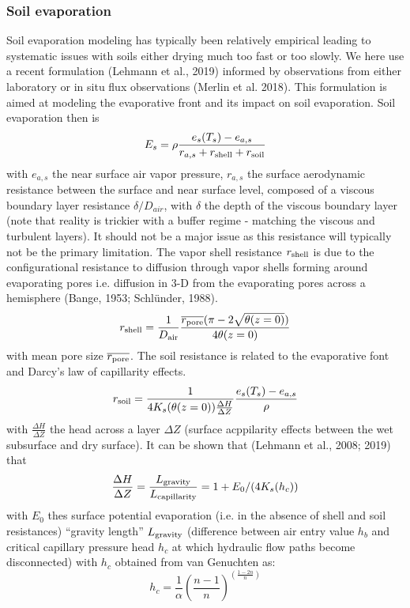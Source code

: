 \documentclass{article}
\begin{document}
\subsubsection{Soil evaporation}
Soil evaporation modeling has typically been relatively empirical leading to systematic issues with soils either drying much too fast or too slowly. We here use a recent formulation (Lehmann et al., 2019) informed by observations from either laboratory or in situ flux observations (Merlin et al. 2018). This formulation is aimed at modeling the evaporative front and its impact on soil evaporation. 
Soil evaporation then is 
\begin{equation}
    E_s = \rho \frac{e_s(T_s)-e_{a,s}}{r_{a,s}+r_{\rm shell}+r_{\rm soil}}
\end{equation}
with $e_{a,s}$ the near surface air vapor pressure, $r_{a,s}$ the surface aerodynamic resistance between the surface and near surface level, composed of a viscous boundary layer resistance $\delta /D_{air}$, with $\delta$ the depth of the viscous boundary layer (note that reality is trickier with a buffer regime - matching the viscous and turbulent layers). It should not be a major issue as this resistance will typically not be the primary limitation. The vapor shell resistance $r_{\rm shell}$ is due to the configurational resistance to diffusion through vapor shells forming around evaporating pores i.e. diffusion in 3-D from the evaporating pores across a hemisphere (Bange, 1953; Schlünder, 1988).
\begin{equation}
    r_{\rm shell} = \frac{1}{D_{\rm air}}\frac{\overline{r_{\rm pore}}(\pi-2\sqrt{\theta(z=0)})}{4\theta(z=0)}
\end{equation}
with mean pore size $\overline{r_{\rm pore}}$.
The soil resistance is related to the evaporative font and Darcy's law of capillarity effects.
\begin{equation}
    r_{\rm soil} = \frac{1}{4 K_s(\theta(z=0))\frac{\Delta H}{\Delta Z}}\frac{e_s(T_s)-e_{a,s}}{\rho}
\end{equation}
with $\frac{\Delta H}{\Delta Z}$ the head across a layer $\Delta Z$ (surface acppilarity effects between the wet subsurface and dry surface). It can be shown that (Lehmann et al., 2008; 2019) that 
\begin{equation}
   \frac{\Delta H}{\Delta Z} = \frac{L_{\rm gravity}}{L_{\rm capillarity}} = 1+E_0/(4K_s(h_c))
\end{equation}
with $E_0$ thes surface potential evaporation (i.e. in the absence of shell and soil resistances) “gravity length” $L_{\rm gravity}$ (difference between air entry value $h_b$ and critical capillary pressure head $h_c$ at which hydraulic flow paths become disconnected) with $h_c$ obtained from van Genuchten as:
\begin{equation}
   h_c = \frac{1}{\alpha}\left( \frac{n-1}{n} \right)^{\left( \frac{1-2n}{n} \right)}
\end{equation}
\end{document}
